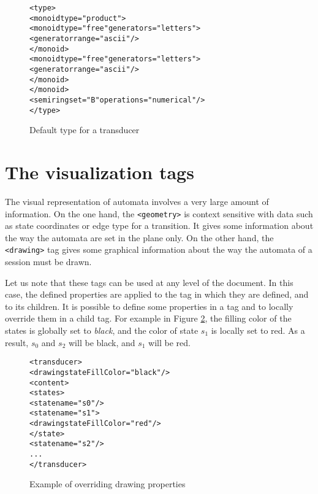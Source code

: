 \documentclass[a4paper]{article}
\def\geometrytag{\texttt{<geometry>}}
\def\drawingtag{\texttt{<drawing>}}
\begin{document}
\begin{figure}[h]
  \begin{center}
\begin{alltt}
<type>
  <monoid type="product">
     <monoid type="free" generators="letters">
       <generator range="ascii"/>
     </monoid>
     <monoid type="free" generators="letters">
       <generator range="ascii"/>
     </monoid>
  </monoid>
  <semiring set="B" operations="numerical"/>
</type>
\end{alltt}

\caption{Default type for a transducer}
\label{transducertype}
  \end{center}
\end{figure}

\newpage
\section{The visualization tags}
\label{title_vizualisation}
The visual representation of automata involves a very large amount of
information. On the one hand, the \geometrytag{} is context sensitive with
data such as state coordinates or edge type for a transition. It gives
some information about the way the automata are set in the plane only.
On the other hand, the \drawingtag{} tag gives some graphical information about
the way the automata of a session must be drawn.

Let us note that these tags can be used at any level of the document. In this
case, the defined properties are applied to the tag in which they are defined,
and to its children. It is possible to define some properties in a tag and to
locally override them in a child tag. For example in Figure
\ref{override_properties}, the filling color of the states is globally set to
\textit{black}, and the color of state $s_1$ is locally set to red. As a
result, $s_0$ and $s_2$ will be black, and $s_1$ will be red.

{\small
\begin{figure}[h]
  \begin{center}
\begin{alltt}
<transducer>
  <drawing stateFillColor="black"/>
  <content>
     <states>
        <state name="s0"/>
        <state name="s1">
            <drawing stateFillColor="red"/>
        </state>
        <state name="s2"/>
      ...
</transducer>
\end{alltt}

\caption{Example of overriding drawing properties}
\label{override_properties}
  \end{center}
\end{figure}
}
\end{document}
